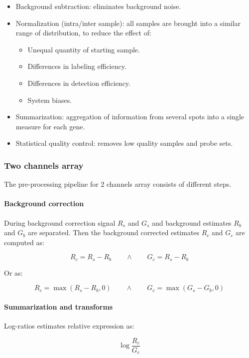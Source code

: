 		\begin{itemize}
			\item Background subtraction: eliminates background noise.
			\item Normalization (intra/inter sample): all samples are brought into a similar range of distribution, to reduce the effect of:

				\begin{itemize}
					\item Unequal quantity of starting sample.
					\item Differences in labeling efficiency.
					\item Differences in detection efficiency.
					\item System biases.
				\end{itemize}

			\item Summarization: aggregation of information from several spots into a single measure for each gene.
			\item Statistical quality control: removes low quality samples and probe sets.

		\end{itemize}
	

		\subsubsection{Two channels array}
		The pre-processing pipeline for $2$ channels array consists of different steps.

			\paragraph{Background correction}
			During background correction signal $R_s$ and $G_s$ and background estimates $R_b$ and $G_b$ are separated.
			Then the background corrected estimates $R_c$ and $G_c$ are computed as:

			$$R_c = R_s-R_b\qquad\land\qquad G_c = R_s-R_b$$

			Or as:

			$$R_c = \max(R_s-R_b, 0)\qquad\land\qquad G_c = \max(G_s-G_b, 0)$$

			\paragraph{Summarization and transforms}
			Log-ratios estimates relative expression as:

			$$\log\frac{R_c}{G_c}$$

